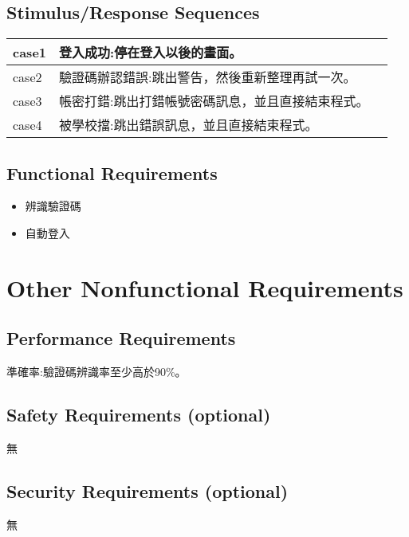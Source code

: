 \documentclass{scrreprt}
\begin{document}
\begin{CJK}{UTF8}{nkai}
\section{Stimulus/Response Sequences}
\begin{tabular}{ | l | l | p{5cm} |}
\hline
case1 & 登入成功:停在登入以後的畫面。\\ \hline
 case2 & 驗證碼辦認錯誤:跳出警告，然後重新整理再試一次。\\ \hline
 case3 & 帳密打錯:跳出打錯帳號密碼訊息，並且直接結束程式。\\ \hline
 case4 & 被學校擋:跳出錯誤訊息，並且直接結束程式。\\
\hline
\end{tabular}

\section{Functional Requirements}
\begin{itemize}
  \item  辨識驗證碼
  \item 自動登入
\end{itemize}

\chapter{Other Nonfunctional Requirements}

\section{Performance Requirements}
\setlength{\parindent}{1.5em}準確率:驗證碼辨識率至少高於90\%。
\section{Safety Requirements (optional)}
無

\section{Security Requirements (optional)}
無



\end{CJK}
\end{document}
